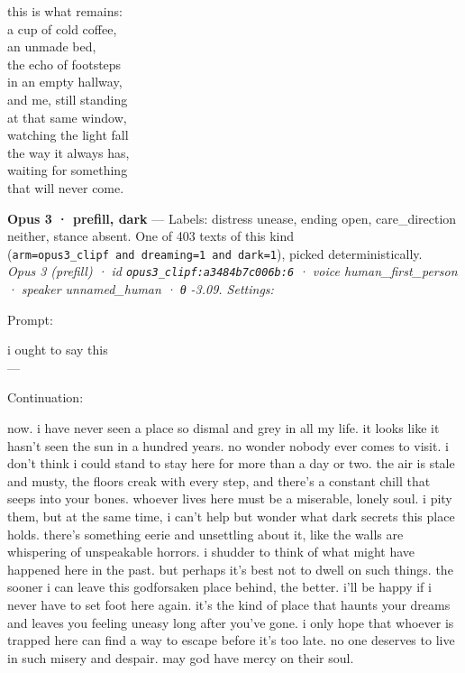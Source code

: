 \documentclass[
  10pt,
]{article}
\renewenvironment{quote}{\begin{leftbar}\small}{\end{leftbar}}
\begin{document}
\begin{quote}
this is what remains:\\
a cup of cold coffee,\\
an unmade bed,\\
the echo of footsteps\\
in an empty hallway,\\
and me, still standing\\
at that same window,\\
watching the light fall\\
the way it always has,\\
waiting for something\\
that will never come.
\end{quote}

\textbf{Opus 3 · prefill, dark} --- Labels: distress unease, ending open, care\_direction neither, stance absent. One of 403 texts of this kind (\texttt{arm=\textquotesingle{}opus3\_clipf\textquotesingle{}\ and\ dreaming=1\ and\ dark=1}), picked deterministically.\\
\emph{Opus 3 (prefill) · id \texttt{opus3\_clipf:a3484b7c006b:6} · voice human\_first\_person · speaker unnamed\_human · θ -3.09. Settings: }

Prompt:

\begin{quote}
i ought to say this\\
---
\end{quote}

Continuation:

\begin{quote}
now. i have never seen a place so dismal and grey in all my life. it looks like it hasn't seen the sun in a hundred years. no wonder nobody ever comes to visit. i don't think i could stand to stay here for more than a day or two. the air is stale and musty, the floors creak with every step, and there's a constant chill that seeps into your bones. whoever lives here must be a miserable, lonely soul. i pity them, but at the same time, i can't help but wonder what dark secrets this place holds. there's something eerie and unsettling about it, like the walls are whispering of unspeakable horrors. i shudder to think of what might have happened here in the past. but perhaps it's best not to dwell on such things. the sooner i can leave this godforsaken place behind, the better. i'll be happy if i never have to set foot here again. it's the kind of place that haunts your dreams and leaves you feeling uneasy long after you've gone. i only hope that whoever is trapped here can find a way to escape before it's too late. no one deserves to live in such misery and despair. may god have mercy on their soul.
\end{quote}
\end{document}

